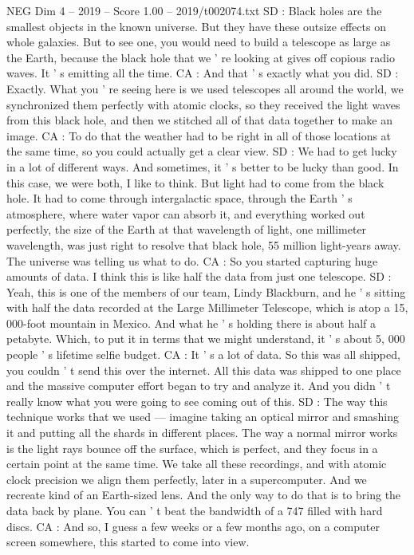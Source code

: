 \begin{textsample}{NEG Dim 4 – 2019 – Score 1.00 – 2019/t002074.txt}
SD : Black holes are the smallest objects in the known universe.
But they have these outsize effects on whole galaxies.
But to see one, you would need to build a telescope as large as the Earth, because the black hole that we ' re looking at gives off copious radio waves.
It ' s emitting all the time.
CA : And that ' s exactly what you did.
SD : Exactly.
What you ' re seeing here is we used telescopes all around the world, we synchronized them perfectly with atomic clocks, so they received the light waves from this black hole, and then we stitched all of that data together to make an image.
CA : To do that the weather had to be right in all of those locations at the same time, so you could actually get a clear view.
SD : We had to get lucky in a lot of different ways.
And sometimes, it ' s better to be lucky than good.
In this case, we were both, I like to think.
But light had to come from the black hole.
It had to come through intergalactic space, through the Earth ' s atmosphere, where water vapor can absorb it, and everything worked out perfectly, the size of the Earth at that wavelength of light, one millimeter wavelength, was just right to resolve that black hole, 55 million light-years away.
The universe was telling us what to do.
CA : So you started capturing huge amounts of data.
I think this is like half the data from just one telescope.
SD : Yeah, this is one of the members of our team, Lindy Blackburn, and he ' s sitting with half the data recorded at the Large Millimeter Telescope, which is atop a 15, 000-foot mountain in Mexico.
And what he ' s holding there is about half a petabyte.
Which, to put it in terms that we might understand, it ' s about 5, 000 people ' s lifetime selfie budget.
CA : It ' s a lot of data.
So this was all shipped, you couldn ' t send this over the internet.
All this data was shipped to one place and the massive computer effort began to try and analyze it.
And you didn ' t really know what you were going to see coming out of this.
SD : The way this technique works that we used — imagine taking an optical mirror and smashing it and putting all the shards in different places.
The way a normal mirror works is the light rays bounce off the surface, which is perfect, and they focus in a certain point at the same time.
We take all these recordings, and with atomic clock precision we align them perfectly, later in a supercomputer.
And we recreate kind of an Earth-sized lens.
And the only way to do that is to bring the data back by plane.
You can ' t beat the bandwidth of a 747 filled with hard discs.
CA : And so, I guess a few weeks or a few months ago, on a computer screen somewhere, this started to come into view.

\end{textsample}
